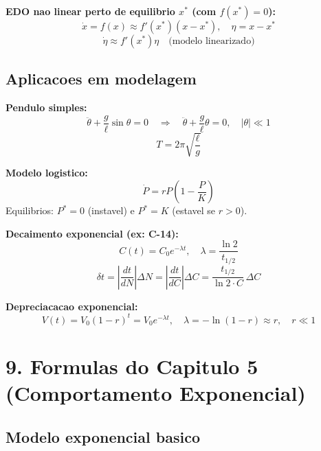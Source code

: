 \documentclass[12pt,a4paper]{article}
\begin{document}
\textbf{EDO nao linear perto de equilibrio $x^*$ (com $f(x^*)=0$):}
\begin{equation}
\dot{x} = f(x) \approx f'(x^*)(x-x^*), \quad \eta = x - x^*
\end{equation}
\begin{equation}
\dot{\eta} \approx f'(x^*)\eta \quad \text{(modelo linearizado)}
\end{equation}

\subsection*{Aplicacoes em modelagem}

\textbf{Pendulo simples:}
\begin{equation}
\ddot{\theta} + \frac{g}{\ell}\sin\theta = 0 \quad \Rightarrow \quad
\ddot{\theta} + \frac{g}{\ell}\theta = 0, \quad |\theta| \ll 1
\end{equation}
\begin{equation}
T = 2\pi\sqrt{\frac{\ell}{g}}
\end{equation}

\textbf{Modelo logistico:}
\begin{equation}
\dot{P} = rP\left(1 - \frac{P}{K}\right)
\end{equation}
Equilibrios: $P^* = 0$ (instavel) e $P^* = K$ (estavel se $r>0$).

\textbf{Decaimento exponencial (ex: C-14):}
\begin{equation}
C(t) = C_0 e^{-\lambda t}, \quad \lambda = \frac{\ln 2}{t_{1/2}}
\end{equation}
\begin{equation}
\delta t = \left|\frac{dt}{dN}\right|\Delta N
= \left|\frac{dt}{dC}\right|\Delta C
= \frac{t_{1/2}}{\ln 2\cdot C}\,\Delta C
\end{equation}

\textbf{Depreciacacao exponencial:}
\begin{equation}
V(t) = V_0 (1-r)^t = V_0 e^{-\lambda t}, \quad \lambda = -\ln(1-r) \approx r, \quad r \ll 1
\end{equation}

\section*{9. Formulas do Capitulo 5 (Comportamento Exponencial)}

\subsection*{Modelo exponencial basico}
\end{document}
